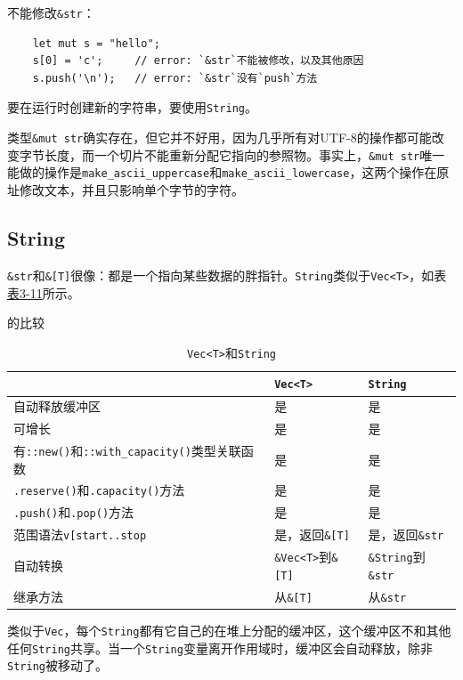 不能修改\texttt{\&str}：
\begin{verbatim}
    let mut s = "hello";
    s[0] = 'c';     // error: `&str`不能被修改，以及其他原因
    s.push('\n');   // error: `&str`没有`push`方法
\end{verbatim}

要在运行时创建新的字符串，要使用\texttt{String}。

类型\texttt{\&mut str}确实存在，但它并不好用，因为几乎所有对UTF-8的操作都可能改变字节长度，而一个切片不能重新分配它指向的参照物。事实上，\texttt{\&mut str}唯一能做的操作是\texttt{make\_ascii\_uppercase}和\texttt{make\_ascii\_lowercase}，这两个操作在原址修改文本，并且只影响单个字节的字符。

\subsection{String}
\texttt{\&str}和\texttt{\&[T]}很像：都是一个指向某些数据的胖指针。\texttt{String}类似于\texttt{Vec<T>}，如表\hyperref[t3-11]{表3-11}所示。

\begin{table}[htbp]
    \centering
    \caption{\texttt{Vec<T>}和\texttt{String}}的比较
    \label{t3-11}
    \begin{tabular}{p{}p{}p{}}
        \hline
                    & \textbf{\texttt{Vec<T>}} & \textbf{\texttt{String}} \\
        \hline
        自动释放缓冲区 & 是 & 是 \\
        可增长       & 是 & 是 \\
        有\texttt{::new()}和\texttt{::with\_capacity()}类型关联函数 & 是 & 是 \\
        \texttt{.reserve()}和\texttt{.capacity()}方法 & 是 & 是 \\
        \texttt{.push()}和\texttt{.pop()}方法 & 是 & 是 \\
        范围语法\texttt{v[start..stop} & 是，返回\texttt{\&[T]} & 是，返回\texttt{\&str} \\
        自动转换      & \texttt{\&Vec<T>}到\texttt{\&[T]} & \texttt{\&String}到\texttt{\&str} \\
        继承方法      & 从\texttt{\&[T]} & 从\texttt{\&str} \\
    \end{tabular}
\end{table}

类似于\texttt{Vec}，每个\texttt{String}都有它自己的在堆上分配的缓冲区，这个缓冲区不和其他任何\texttt{String}共享。当一个\texttt{String}变量离开作用域时，缓冲区会自动释放，除非\texttt{String}被移动了。


